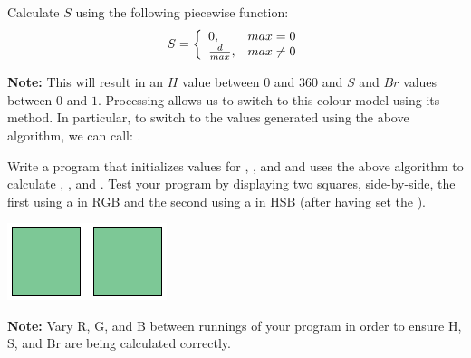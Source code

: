 \begin{questions}
{\begin{center}
{{            Calculate $S$ using the following piecewise function:
            \[
              S = \left\{\begin{array}{l r}
                0, & max = 0\\
                \frac{d}{max}, & max \ne 0
              \end{array}\right.
            \]
        }}
      \end{center}
      \begin{center}
      \end{center}
      \begin{center}
        \parbox{0.9\textwidth}{\textbf{Note:} This will result in an $H$ value between $0$ and $360$ and $S$ and $Br$ values between $0$ and $1$. Processing allows us to switch to this colour model using its  method. In particular, to switch to the values generated using the above algorithm, we can call: .
        }
      \end{center}
      }

      Write a program that initializes values for , , and  and uses the above algorithm to calculate , , and . Test your program by displaying two squares, side-by-side, the first using a  in RGB and the second using a  in HSB (after having set the ).
      \begin{center}
        \includegraphics[scale=0.5]{files/Squares}
      \end{center}
      {\small\textbf{Note:} Vary R, G, and B between runnings of your program in order to ensure H, S, and Br are being calculated correctly.}
      {\footnotesize
      \begin{center}
\end{center}}
\end{questions}
